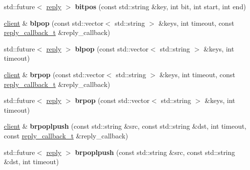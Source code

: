 \begin{DoxyCompactItemize}
std\+::future$<$ \mbox{\hyperlink{classcpp__redis_1_1reply}{reply}} $>$ {\bfseries bitpos} (const std\+::string \&key, int bit, int start, int end)
\item 
\mbox{\label{classcpp__redis_1_1client_a432c2677b13dc8e2a9d7afe7eade39e3}} 
\mbox{\hyperlink{classcpp__redis_1_1client}{client}} \& {\bfseries blpop} (const std\+::vector$<$ std\+::string $>$ \&keys, int timeout, const \mbox{\hyperlink{classcpp__redis_1_1client_af7a65eb21aa25230bfbb0b0203c4fc04}{reply\+\_\+callback\+\_\+t}} \&reply\+\_\+callback)
\item 
\mbox{\label{classcpp__redis_1_1client_ac54c987bca4efb4bf6659b063f19d5ff}} 
std\+::future$<$ \mbox{\hyperlink{classcpp__redis_1_1reply}{reply}} $>$ {\bfseries blpop} (const std\+::vector$<$ std\+::string $>$ \&keys, int timeout)
\item 
\mbox{\label{classcpp__redis_1_1client_adc565332168e31ebbd762f2cb12ad4d1}} 
\mbox{\hyperlink{classcpp__redis_1_1client}{client}} \& {\bfseries brpop} (const std\+::vector$<$ std\+::string $>$ \&keys, int timeout, const \mbox{\hyperlink{classcpp__redis_1_1client_af7a65eb21aa25230bfbb0b0203c4fc04}{reply\+\_\+callback\+\_\+t}} \&reply\+\_\+callback)
\item 
\mbox{\label{classcpp__redis_1_1client_aa123b931c6d00027d08f0fcbde2f026e}} 
std\+::future$<$ \mbox{\hyperlink{classcpp__redis_1_1reply}{reply}} $>$ {\bfseries brpop} (const std\+::vector$<$ std\+::string $>$ \&keys, int timeout)
\item 
\mbox{\label{classcpp__redis_1_1client_afa7fb97bb0b30c2c78a605f48b6144e2}} 
\mbox{\hyperlink{classcpp__redis_1_1client}{client}} \& {\bfseries brpoplpush} (const std\+::string \&src, const std\+::string \&dst, int timeout, const \mbox{\hyperlink{classcpp__redis_1_1client_af7a65eb21aa25230bfbb0b0203c4fc04}{reply\+\_\+callback\+\_\+t}} \&reply\+\_\+callback)
\item 
\mbox{\label{classcpp__redis_1_1client_aa30b9303ee0d59b07dd656db2426547e}} 
std\+::future$<$ \mbox{\hyperlink{classcpp__redis_1_1reply}{reply}} $>$ {\bfseries brpoplpush} (const std\+::string \&src, const std\+::string \&dst, int timeout)

\end{DoxyCompactItemize}
